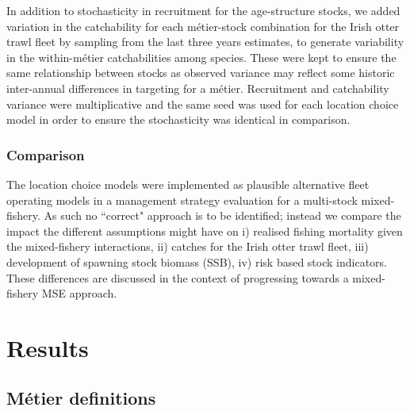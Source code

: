 \documentclass[12pt, halfline, a4paper]{ouparticle}
\begin{document}
In addition to stochasticity in recruitment for the age-structure stocks, we
added variation in the catchability for each métier-stock combination for the
Irish otter trawl fleet by sampling from the last three years estimates, to
generate variability in the within-métier catchabilities among species. These
were kept to ensure the same relationship between stocks as observed variance
may reflect some historic inter-annual differences in targeting for a métier.
Recruitment and catchability variance were multiplicative and the same seed was
used for each location choice model in order to ensure the stochasticity was
identical in comparison.

\subsubsection{Comparison}

The location choice models were implemented as plausible alternative fleet
operating models in a management strategy evaluation for a multi-stock
mixed-fishery. As such no ``correct" approach is to be identified; instead we
compare the impact the different assumptions might have on i) realised fishing
mortality given the mixed-fishery interactions, ii) catches for the Irish otter
trawl fleet, iii) development of spawning stock biomass (SSB), iv) risk based
stock indicators. These differences are discussed in the context of progressing
towards a mixed-fishery MSE approach.

\section{Results}
\label{res}

\subsection{Métier definitions}
\end{document}
